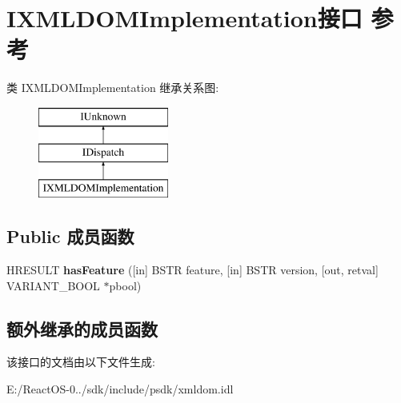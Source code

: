 \hypertarget{interface_i_x_m_l_d_o_m_implementation}{}\section{I\+X\+M\+L\+D\+O\+M\+Implementation接口 参考}
\label{interface_i_x_m_l_d_o_m_implementation}
类 I\+X\+M\+L\+D\+O\+M\+Implementation 继承关系图\+:\begin{figure}[H]
\begin{center}
\leavevmode
\includegraphics[height=3.000000cm]{interface_i_x_m_l_d_o_m_implementation}
\end{center}
\end{figure}
\subsection*{Public 成员函数}
\begin{DoxyCompactItemize}
\item 
\mbox{\label{interface_i_x_m_l_d_o_m_implementation_ab3c76e85f53a157c21f58b7942402f76}} 
H\+R\+E\+S\+U\+LT {\bfseries has\+Feature} (\mbox{[}in\mbox{]} B\+S\+TR feature, \mbox{[}in\mbox{]} B\+S\+TR version, \mbox{[}out, retval\mbox{]} V\+A\+R\+I\+A\+N\+T\+\_\+\+B\+O\+OL $\ast$pbool)
\end{DoxyCompactItemize}
\subsection*{额外继承的成员函数}


该接口的文档由以下文件生成\+:\begin{DoxyCompactItemize}
\item 
E\+:/\+React\+O\+S-\/0../sdk/include/psdk/xmldom.\+idl\end{DoxyCompactItemize}
